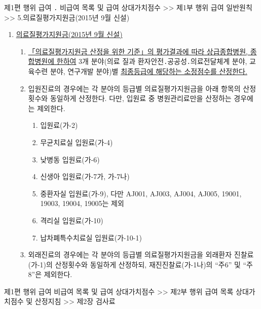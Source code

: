\begin{mdframed}[linecolor=blue,middlelinewidth=2]  
제1편 행위 급여 ․ 비급여 목록 및 급여 상대가치점수 >> 제1부 행위 급여 일반원칙 >>  5.의료질평가지원금(2015년 9월 신설)
\end{mdframed}
\begin{enumerate}[5.]\tightlist
\item  \uline{의료질평가지원금(2015년 9월 신설)}
	\begin{enumerate}[가.]\tightlist
	\item \uline{「의료질평가지원금 산정을 위한 기준」의 평가결과에 따라 상급종합병원, 종합병원에 한하여} 3개 분야(의료 질과 환자안전․공공성․의료전달체계 분야, 교육수련 분야, 연구개발 분야)별 \uline{최종등급에 해당하는 소정점수를 산정한다. }
	\item 입원진료의 경우에는 각 분야의 등급별 의료질평가지원금을 아래 항목의 산정횟수와 동일하게 산정한다. 다만, 입원료 중 병원관리료만을 산정하는 경우에는 제외한다.
		\begin{enumerate}[(1)]\tightlist
		\item 입원료(가-2)		\item 무균치료실 입원료(가-4)
		\item 낮병동 입원료(가-6)
		\item 신생아 입원료(가-7가, 가-7나)
		\item 중환자실 입원료(가-9), 다만 AJ001, AJ003, AJ004, AJ005, 19001, 19003, 19004, 19005는 제외
		\item 격리실 입원료(가-10)
		\item 납차폐특수치료실 입원료(가-10-1)
		\end{enumerate}
	\item 외래진료의 경우에는 각 분야의 등급별 의료질평가지원금을 외래환자 진찰료(가-1)의 산정횟수와 동일하게 산정하되, 재진진찰료(가-1나)의 “주6” 및 “주8”은 제외한다.
	\end{enumerate}  
\end{enumerate}

\begin{mdframed}[linecolor=blue,middlelinewidth=2]  
제1편 행위 급여 \cntrdot{}  비급여 목록 및 급여 상대가치점수 >> 제2부 행위 급여 목록\cntrdot{} 상대가치점수 및 산정지침 >> 제2장 검사료
\end{mdframed}
